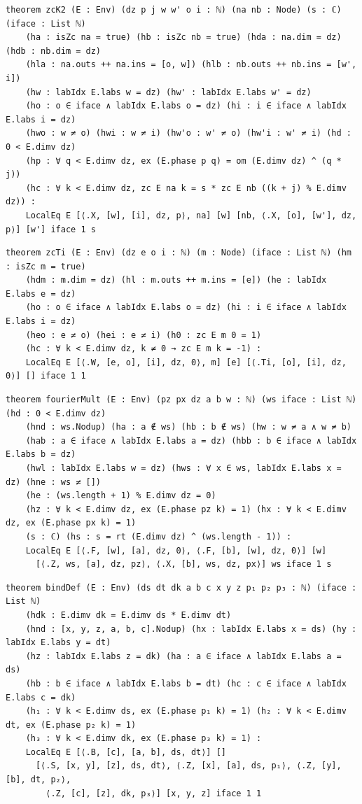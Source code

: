 \begin{lstlisting}[style=leancore]
theorem zcK2 (E : Env) (dz p j w w' o i : ℕ) (na nb : Node) (s : ℂ) (iface : List ℕ)
    (ha : isZc na = true) (hb : isZc nb = true) (hda : na.dim = dz) (hdb : nb.dim = dz)
    (hla : na.outs ++ na.ins = [o, w]) (hlb : nb.outs ++ nb.ins = [w', i])
    (hw : labIdx E.labs w = dz) (hw' : labIdx E.labs w' = dz)
    (ho : o ∈ iface ∧ labIdx E.labs o = dz) (hi : i ∈ iface ∧ labIdx E.labs i = dz)
    (hwo : w ≠ o) (hwi : w ≠ i) (hw'o : w' ≠ o) (hw'i : w' ≠ i) (hd : 0 < E.dimv dz)
    (hp : ∀ q < E.dimv dz, ex (E.phase p q) = om (E.dimv dz) ^ (q * j))
    (hc : ∀ k < E.dimv dz, zc E na k = s * zc E nb ((k + j) % E.dimv dz)) :
    LocalEq E [⟨.X, [w], [i], dz, p⟩, na] [w] [nb, ⟨.X, [o], [w'], dz, p⟩] [w'] iface 1 s
\end{lstlisting}
\begin{lstlisting}[style=leancore]
theorem zcTi (E : Env) (dz e o i : ℕ) (m : Node) (iface : List ℕ) (hm : isZc m = true)
    (hdm : m.dim = dz) (hl : m.outs ++ m.ins = [e]) (he : labIdx E.labs e = dz)
    (ho : o ∈ iface ∧ labIdx E.labs o = dz) (hi : i ∈ iface ∧ labIdx E.labs i = dz)
    (heo : e ≠ o) (hei : e ≠ i) (h0 : zc E m 0 = 1)
    (hc : ∀ k < E.dimv dz, k ≠ 0 → zc E m k = -1) :
    LocalEq E [⟨.W, [e, o], [i], dz, 0⟩, m] [e] [⟨.Ti, [o], [i], dz, 0⟩] [] iface 1 1
\end{lstlisting}
\begin{lstlisting}[style=leancore]
theorem fourierMult (E : Env) (pz px dz a b w : ℕ) (ws iface : List ℕ) (hd : 0 < E.dimv dz)
    (hnd : ws.Nodup) (ha : a ∉ ws) (hb : b ∉ ws) (hw : w ≠ a ∧ w ≠ b)
    (hab : a ∈ iface ∧ labIdx E.labs a = dz) (hbb : b ∈ iface ∧ labIdx E.labs b = dz)
    (hwl : labIdx E.labs w = dz) (hws : ∀ x ∈ ws, labIdx E.labs x = dz) (hne : ws ≠ [])
    (he : (ws.length + 1) % E.dimv dz = 0)
    (hz : ∀ k < E.dimv dz, ex (E.phase pz k) = 1) (hx : ∀ k < E.dimv dz, ex (E.phase px k) = 1)
    (s : ℂ) (hs : s = rt (E.dimv dz) ^ (ws.length - 1)) :
    LocalEq E [⟨.F, [w], [a], dz, 0⟩, ⟨.F, [b], [w], dz, 0⟩] [w]
      [⟨.Z, ws, [a], dz, pz⟩, ⟨.X, [b], ws, dz, px⟩] ws iface 1 s
\end{lstlisting}
\begin{lstlisting}[style=leancore]
theorem bindDef (E : Env) (ds dt dk a b c x y z p₁ p₂ p₃ : ℕ) (iface : List ℕ)
    (hdk : E.dimv dk = E.dimv ds * E.dimv dt)
    (hnd : [x, y, z, a, b, c].Nodup) (hx : labIdx E.labs x = ds) (hy : labIdx E.labs y = dt)
    (hz : labIdx E.labs z = dk) (ha : a ∈ iface ∧ labIdx E.labs a = ds)
    (hb : b ∈ iface ∧ labIdx E.labs b = dt) (hc : c ∈ iface ∧ labIdx E.labs c = dk)
    (h₁ : ∀ k < E.dimv ds, ex (E.phase p₁ k) = 1) (h₂ : ∀ k < E.dimv dt, ex (E.phase p₂ k) = 1)
    (h₃ : ∀ k < E.dimv dk, ex (E.phase p₃ k) = 1) :
    LocalEq E [⟨.B, [c], [a, b], ds, dt⟩] []
      [⟨.S, [x, y], [z], ds, dt⟩, ⟨.Z, [x], [a], ds, p₁⟩, ⟨.Z, [y], [b], dt, p₂⟩,
        ⟨.Z, [c], [z], dk, p₃⟩] [x, y, z] iface 1 1
\end{lstlisting}
